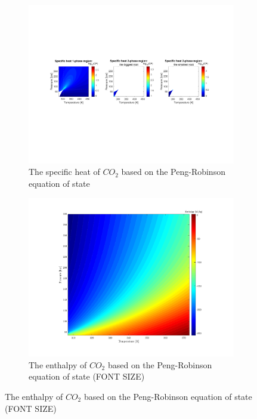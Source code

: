 \documentclass[../Article_Model_Parameters.tex]{subfiles}
\begin{document}
\begin{figure}[H]
\begin{subfigure}[b]{0.31\textwidth}
			\label{fig: SFE_Properties_Density}
		\end{subfigure}
		\hfill
		\begin{subfigure}[b]{0.31\textwidth}
			\centering
			\includegraphics[trim = 2.9cm 8cm 18cm 7cm,clip,width=\textwidth]{Figures/CP.pdf}	
			\caption{The specific heat of $CO_2$ based on the Peng-Robinson equation of state}
			\label{fig: SFE_Properties_CP}
		\end{subfigure}
		\hfill
		\begin{subfigure}[b]{0.31\textwidth}
			\centering
			\includegraphics[trim = 0cm 0cm 0cm 0cm,clip,width=\textwidth]{Figures/Enthalpy.pdf}	
			\caption{The enthalpy of $CO_2$ based on the Peng-Robinson equation of state (\color{red}FONT SIZE)}

\end{subfigure}
\end{figure}
\end{document}
